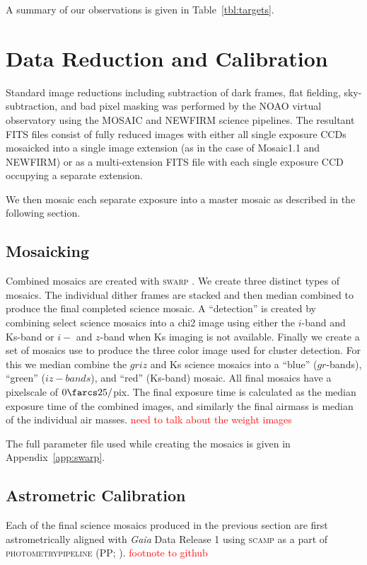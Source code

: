 \documentclass[apj, revtex4]{emulateapj}
\newcommand{\editorial}[1]{\textcolor{red}{#1}}
\begin{document}
A summary of our observations is given in Table~\ref{tbl:targets}.

\section{Data Reduction and Calibration}\label{sec:data reduction}
Standard image reductions including subtraction of dark frames, flat fielding, sky-subtraction, and bad pixel masking was performed by the NOAO virtual observatory using the MOSAIC \citep{Valdes2007} and NEWFIRM \citep{Swaters2009} science pipelines. The resultant FITS files consist of fully reduced images with either all single exposure CCDs mosaicked into a single image extension (as in the case of Mosaic1.1 and NEWFIRM) or as a multi-extension FITS file with each single exposure CCD occupying a separate extension. 

We then mosaic each separate exposure into a master mosaic as described in the following section.

\subsection{Mosaicking}\label{sec:mosaicks}
Combined mosaics are created with \textsc{swarp} \citep{Bertin2002}. We create three distinct types of mosaics. The individual dither frames are stacked and then median combined to produce the final completed science mosaic. A ``detection'' is created by combining select science mosaics into a chi2 image using either the $i$-band and Ks-band or $i-$ and $z$-band when Ks imaging is not available. Finally we create a set of mosaics use to produce the three color image used for cluster detection. For this we median combine the $griz$ and Ks science mosaics into a ``blue'' ($gr$-bands), ``green'' ($iz-bands$), and ``red'' (Ks-band) mosaic. All final mosaics have a pixelscale of $0\farcs25/$pix. The final exposure time is calculated as the median exposure time of the combined images, and similarly the final airmass is median of the individual air masses. \editorial{need to talk about the weight images}

The full parameter file used while creating the mosaics is given in Appendix~\ref{app:swarp}.

\subsection{Astrometric Calibration}
Each of the final science mosaics produced in the previous section are first astrometrically aligned with \textit{Gaia} \citep{GaiaCollaboration2016} Data Release 1 \citep{GaiaCollaboration2016a} using \textsc{scamp} \citep{Bertin2006} as a part of \textsc{photometrypipeline} (PP; \citealt{Mommert2017}). \editorial{footnote to github}
\end{document}

